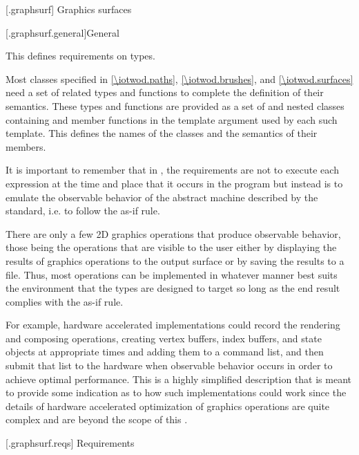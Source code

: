 
 [\iotwod.graphsurf] {Graphics surfaces}

 [\iotwod.graphsurf.general]{General}

\pnum
This \clause{} defines requirements on \term{\graphicssurfacestemplparamnospace} types.

\pnum
Most classes specified in \ref{\iotwod.paths}, \ref{\iotwod.brushes}, and \ref{\iotwod.surfaces} need a set of related types and functions to complete the definition of their semantics. These types and functions are provided as a set of  and nested classes containing  and  member functions in the template argument \tcode{\graphicssurfacestemplparamnospace} used by each such template. This \clause{} defines the names of the classes and the semantics of their members.

\pnum
\begin{note}
It is important to remember that in \Cpp{}, the requirements are not to execute each expression at the time and place that it occurs in the program but instead is to emulate the observable behavior of the abstract machine described by the \Cpp{} standard, i.e. to follow the as-if rule. 

\pnum
There are only a few 2D graphics operations that produce observable behavior, those being the operations that are visible to the user either by displaying the results of graphics operations to the output surface or by saving the results to a file. Thus, most operations can be implemented in whatever manner best suits the environment that the \graphicssurfacestemplparamnospace{} types are designed to target so long as the end result complies with the as-if rule.

\pnum
For example, hardware accelerated implementations could record the rendering and composing operations, creating vertex buffers, index buffers, and state objects at appropriate times and adding them to a command list, and then submit that list to the hardware when observable behavior occurs in order to achieve optimal performance. This is a highly simplified description that is meant to provide some indication as to how such implementations could work since the details of hardware accelerated optimization of graphics operations are quite complex and are beyond the scope of this \documenttypename{}.
\end{note}

 [\iotwod.graphsurf.reqs] {Requirements}








